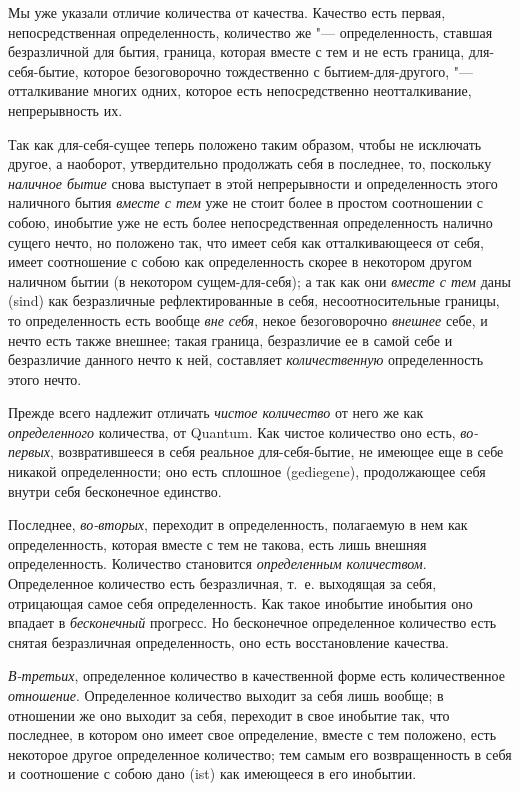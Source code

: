 \clearpage

Мы уже указали отличие количества от качества. Качество есть первая,
непосредственная определенность, количество же "--- определенность, ставшая
безразличной для бытия, граница, которая вместе с тем и не есть граница,
для-себя-бытие, которое безоговорочно тождественно с бытием-для-другого,
"--- отталкивание многих одних, которое есть непосредственно
неотталкивание, непрерывность их.

Так как для-себя-сущее теперь положено таким образом, чтобы не исключать
другое, а наоборот, утвердительно продолжать себя в последнее, то,
поскольку {\em наличное бытие} снова выступает в этой
непрерывности и определенность этого наличного бытия
{\em вместе с тем} уже не стоит более в простом
соотношении с собою, инобытие уже не есть более непосредственная
определенность налично сущего нечто, но положено так, что имеет себя как
отталкивающееся от себя, имеет соотношение с собою как определенность
скорее в некотором другом наличном бытии (в некотором сущем-для-себя); а
так как они {\em вместе с тем} даны
(sind) как безразличные рефлектированные в себя,
несоотносительные границы, то определенность есть вообще
{\em вне себя}, некое безоговорочно
{\em внешнее} себе, и нечто есть также внешнее; такая
граница, безразличие ее в самой себе и безразличие данного нечто к ней,
составляет {\em количественную} определенность этого нечто.

Прежде всего надлежит отличать {\em чистое количество}
от него же как {\em определенного} количества, от
Quantum. Как чистое количество оно есть,
{\em во-первых}, возвратившееся в себя реальное
для-себя-бытие, не имеющее еще в себе никакой определенности; оно есть
сплошное (gediegene), продолжающее себя внутри себя бесконечное единство.

Последнее, {\em во-вторых}, переходит в определенность,
полагаемую в нем как определенность, которая вместе с тем не такова,
есть лишь внешняя определенность. Количество становится
{\em определенным количеством}. Определенное количество
есть безразличная, т.~е. выходящая за себя, отрицающая самое себя
определенность. Как такое инобытие инобытия оно впадает в
{\em бесконечный} прогресс. Но бесконечное определенное количество есть
снятая безразличная определенность, оно есть восстановление качества.

{\em В-третьих}, определенное количество в качественной
форме есть количественное {\em отношение}. Определенное
количество выходит за себя лишь вообще; в отношении же оно выходит за себя,
переходит в свое инобытие так, что последнее, в котором оно имеет свое
определение, вместе с тем положено, есть некоторое другое определенное
количество; тем самым его возвращенность в себя и соотношение с собою дано
(ist) как имеющееся в его инобытии.

